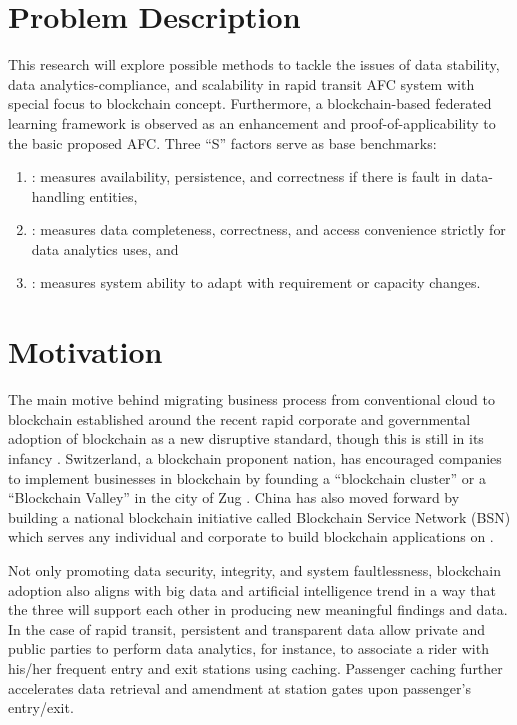 \documentclass[a4paper,12pt,oneside, utf8x]{report}
\begin{document}


\section{Problem Description}
\label{sprobdesc}
This research will explore possible methods to tackle the issues of data stability, data analytics-compliance, and scalability in rapid transit AFC system with special focus to blockchain concept. Furthermore, a blockchain-based federated learning framework is observed as an enhancement and proof-of-applicability to the basic proposed AFC. Three “S” factors serve as base benchmarks:
\begin{enumerate}
\item {}: measures availability, persistence, and correctness if there is fault in data-handling entities,
\item {}: measures data completeness, correctness, and access convenience strictly for data analytics uses, and
\item {}: measures system ability to adapt with requirement or capacity changes.
\end{enumerate}

\section{Motivation}
\label{smotiv}
The main motive behind migrating business process from conventional cloud to blockchain established around the recent rapid corporate and governmental adoption of blockchain as a new disruptive standard, though this is still in its infancy \cite{a9}. Switzerland, a blockchain proponent nation, has encouraged companies to implement businesses in blockchain by founding a “blockchain cluster” or a “Blockchain Valley” in the city of Zug \cite{a10}. China has also moved forward by building a national blockchain initiative called Blockchain Service Network (BSN) which serves any individual and corporate to build blockchain applications on \cite{a8}.

Not only promoting data security, integrity, and system faultlessness, blockchain adoption also aligns with big data and artificial intelligence trend in a way that the three will support each other in producing new meaningful findings and data. In the case of rapid transit, persistent and transparent data allow private and public parties to perform data analytics, for instance, to associate a rider with his/her frequent entry and exit stations using caching. Passenger caching further accelerates data retrieval and amendment at station gates upon passenger's entry/exit.
\end{document}
